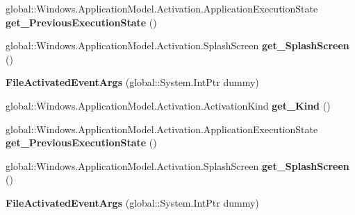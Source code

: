 \begin{DoxyCompactItemize}
global\+::\+Windows.\+Application\+Model.\+Activation.\+Application\+Execution\+State {\bfseries get\+\_\+\+Previous\+Execution\+State} ()
\item 
\mbox{\label{class_windows_1_1_application_model_1_1_activation_1_1_file_activated_event_args_a8924bd743f51e1452ae2c4951c82d833}} 
global\+::\+Windows.\+Application\+Model.\+Activation.\+Splash\+Screen {\bfseries get\+\_\+\+Splash\+Screen} ()
\item 
\mbox{\label{class_windows_1_1_application_model_1_1_activation_1_1_file_activated_event_args_a9b823668ef64c779eaab2f5823ec10f4}} 
{\bfseries File\+Activated\+Event\+Args} (global\+::\+System.\+Int\+Ptr dummy)
\item 
\mbox{\label{class_windows_1_1_application_model_1_1_activation_1_1_file_activated_event_args_a8ee51c8c3aa923f508add80971448095}} 
global\+::\+Windows.\+Application\+Model.\+Activation.\+Activation\+Kind {\bfseries get\+\_\+\+Kind} ()
\item 
\mbox{\label{class_windows_1_1_application_model_1_1_activation_1_1_file_activated_event_args_af7b1a8b374a110f715e4505b460818c6}} 
global\+::\+Windows.\+Application\+Model.\+Activation.\+Application\+Execution\+State {\bfseries get\+\_\+\+Previous\+Execution\+State} ()
\item 
\mbox{\label{class_windows_1_1_application_model_1_1_activation_1_1_file_activated_event_args_a8924bd743f51e1452ae2c4951c82d833}} 
global\+::\+Windows.\+Application\+Model.\+Activation.\+Splash\+Screen {\bfseries get\+\_\+\+Splash\+Screen} ()
\item 
\mbox{\label{class_windows_1_1_application_model_1_1_activation_1_1_file_activated_event_args_a9b823668ef64c779eaab2f5823ec10f4}} 
{\bfseries File\+Activated\+Event\+Args} (global\+::\+System.\+Int\+Ptr dummy)

\end{DoxyCompactItemize}
